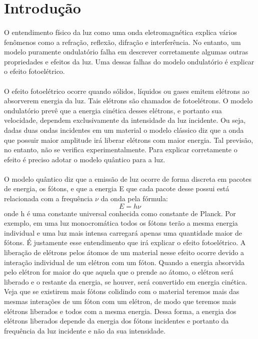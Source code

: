 \documentclass[a4paper,11pt]{article}
\begin{document}
\newpage
\section{Introdução}

\paragraph{}O entendimento físico da luz como uma onda
eletromagnética explica vários fenômenos como a refração,
reflexão, difração e interferência. No entanto, um modelo puramente ondulatório
falha em descrever corretamente algumas outras propriedades
e efeitos da luz. Uma dessas falhas do modelo ondulatório é
explicar o efeito fotoelétrico.

\paragraph{}O efeito fotoelétrico ocorre quando sólidos,
líquidos ou gases emitem elétrons ao absorverem energia da
luz.
Tais elétrons são chamados de fotoelétrons. O modelo
ondulatório prevê que a energia cinética desses elétrons, e
portanto sua velocidade, dependem exclusivamente da
intensidade da luz incidente. Ou seja, dadas duas ondas
incidentes em um material o modelo clássico diz que a onda que possuir maior
amplitude irá liberar elétrons com maior energia. Tal
previsão, no entanto, não se verifica experimentalmente.
Para explicar corretamente o efeito é preciso adotar o
modelo quântico para a luz.

\paragraph{}O modelo quântico diz que a emissão de luz
ocorre de forma discreta em pacotes de energia, os fótons, e que a
energia E que cada
pacote desse possui está relacionada com a frequência
$\nu$ da onda
pela fórmula:
\begin{equation}
E = h\nu
\end{equation}
onde h é uma constante universal conhecida como constante de
Planck. Por exemplo, em uma luz monocromática todos os
fótons terão a mesma energia individual e uma luz mais
intensa carregará apenas uma quantidade maior de fótons. É
justamente esse entendimento que irá explicar o efeito
fotoelétrico. A liberação de elétrons pelos átomos de um
material nesse efeito ocorre devido a interação individual de um
elétron com um fóton. Quando a energia absorvida pelo
elétron for maior do que aquela que o prende ao
átomo, o elétron será liberado e o restante da
energia, se houver, será convertido em energia cinética.
Veja que se existirem mais fótons colidindo com o material
teremos mais das mesmas interações de um fóton com um elétron,
de modo que teremos mais elétrons liberados e todos com a
mesma energia. Dessa forma, a  energia dos elétrons liberados
depende da energia dos fótons incidentes e portanto da
frequência da luz incidente e não da sua intensidade.
\end{document}
